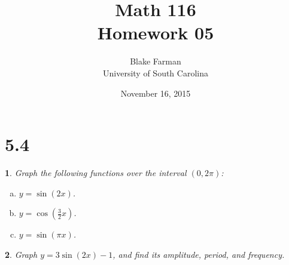 \documentclass[12pt]{amsart}
\author{Blake Farman\\University of South Carolina}
\title{Math 116\\Homework 05}
\date{November 16, 2015}
\theoremstyle{plain}
\newtheorem{thm}{}
\begin{document}
\maketitle

\section*{5.4}

\setcounter{thm}{3}
\begin{thm}
  Graph the following functions over the interval $(0, 2\pi)$:
  \begin{enumerate}[(a)]
  \item
    $\displaystyle{y = \sin(2x)}$.
  \item
    $\displaystyle{y = \cos\left(\frac{3}{2}x\right)}$.
  \item
    $\displaystyle{y = \sin(\pi x)}$.
  \end{enumerate}
\end{thm}

\setcounter{thm}{9}
\begin{thm}
  Graph $y = 3\sin(2x) - 1$, and find its amplitude, period, and frequency.
\end{thm}
\end{document}
